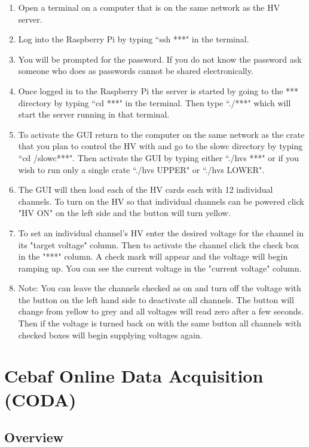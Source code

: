 \documentclass[oneside]{book}   %
\begin{document}
\begin{enumerate}
	\item Open a terminal on a computer that is on the same network as the HV server.
	\item Log into the Raspberry Pi by typing ``ssh ***" in the terminal.
	\item You will be prompted for the password. If you do not know the password ask someone who does as passwords cannot be shared electronically. 
	\item Once logged in to the Raspberry Pi the server is started by going to the *** directory by typing ``cd ***" in the terminal. Then type ``./***" which will start the server running in that terminal.
	\item To activate the GUI return to the computer on the same network as the crate that you plan to control the HV with and go to the slowc directory by typing ``cd /slowc***". Then activate the GUI by typing either ``./hvs ***" or if you wish to run only a single crate ``./hvs UPPER" or ``./hvs LOWER".
	\item The GUI will then load each of the HV cards each with 12 individual channels. To turn on the HV so that individual channels can be powered click "HV ON" on the left side and the button will turn yellow.
	\item To set an individual channel's HV enter the desired voltage for the channel in its "target voltage" column. Then to activate the channel click the check box in the "***" column. A check mark will appear and the voltage will begin ramping up. You can see the current voltage in the "current voltage" column.
	\item Note: You can leave the channels checked as on and turn off the voltage with the button on the left hand side to deactivate all channels. The button will change from yellow to grey and all voltages will read zero after a few seconds. Then if the voltage is turned back on with the same button all channels with checked boxes will begin supplying voltages again. 
\end{enumerate}

\section{Cebaf Online Data Acquisition (CODA)}
\label{sec:coda}

\subsection{Overview}
\label{ssec:coda_overview}
\end{document}

